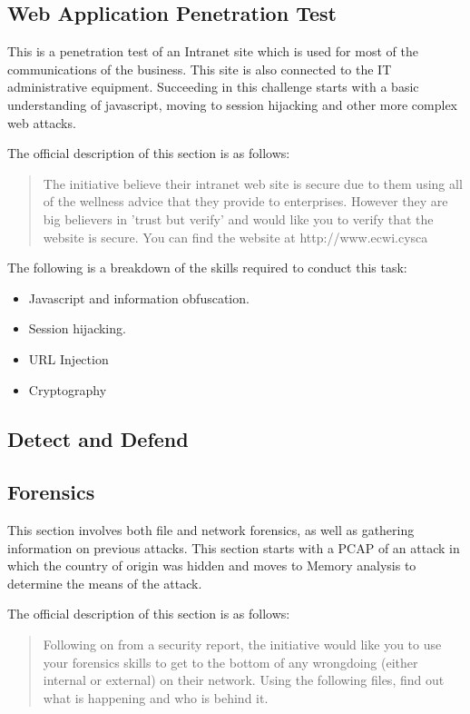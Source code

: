 \documentclass[a4paper,11pt]{report}
\begin{document}
		\subsection{Web Application Penetration Test}
			This is a penetration test of an Intranet site which is used for most of the communications of the business. 
			This site is also connected to the IT administrative equipment. 
			Succeeding in this challenge starts with a basic understanding of javascript, moving to session hijacking and other more complex web attacks. 
			
			The official description of this section is as follows:
			\begin{quote}
				The initiative believe their intranet web site is secure due to them using all of the wellness advice that they provide to enterprises. However they are big believers in 'trust but verify' and would like you to verify that the website is secure. You can find the website at http://www.ecwi.cysca
			\end{quote}

			The following is a breakdown of the skills required to conduct this task:
			\begin{itemize}
				\item Javascript and information obfuscation. 
				\item Session hijacking.
				\item URL Injection
				\item Cryptography
			\end{itemize}
		\subsection{Detect and Defend}
		\subsection{Forensics}
			This section involves both file and network forensics, as well as gathering information on previous attacks. 
			This section starts with a PCAP of an attack in which the country of origin was hidden and moves to Memory analysis to determine the means of the attack. 
			
			The official description of this section is as follows:
			\begin{quote}
				Following on from a security report, the initiative would like you to use your forensics skills to get to the bottom of any wrongdoing (either internal or external) on their network. Using the following files, find out what is happening and who is behind it. 
			\end{quote}
\end{document}
